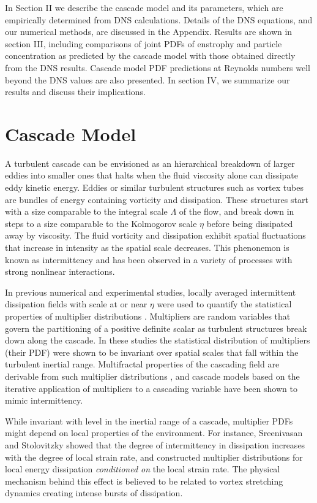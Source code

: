 \documentclass[aps,pra,twocolumn,groupedaddress,showkeys,showpacs,floatfix]{revtex4}
\begin{document}
In Section II we describe the cascade model and its parameters, which are
empirically determined from DNS calculations. Details of the DNS equations, and
our numerical methods, are discussed in the Appendix. Results are shown in section
III, including comparisons of joint PDFs of enstrophy and particle
concentration as predicted by the cascade model with those obtained directly
from the DNS results. Cascade model PDF predictions at Reynolds numbers well
beyond the DNS values are also presented. In section IV, we summarize our
results and discuss their implications.
 
\section{ Cascade Model }

 A turbulent cascade can be envisioned as an hierarchical breakdown  of larger
eddies into smaller ones that halts when the  fluid viscosity alone can
dissipate eddy kinetic energy. Eddies or similar turbulent structures such as
vortex tubes are
bundles of energy containing vorticity and dissipation. These
structures start with a size comparable to the integral scale $\Lambda$ of
the flow, and break down in steps to a size  comparable to the Kolmogorov scale
$\eta$ before being dissipated away by viscosity.  The fluid vorticity and
dissipation exhibit spatial fluctuations that increase in intensity as the
spatial scale decreases. This phenonemon is known as intermittency and has been
observed in a variety of processes with strong nonlinear interactions.

In previous numerical and experimental studies, locally averaged intermittent
dissipation fields with scale at or near $\eta$ were used to quantify the
statistical properties of multiplier distributions \cite{Sreenivasan:1}.
Multipliers are random variables that govern the partitioning of a  positive
definite scalar as turbulent structures break down along the cascade. In these
studies the statistical distribution of multipliers (their PDF) were shown to be
invariant over spatial scales that fall within the turbulent inertial range.
Multifractal properties of the cascading field are derivable from such 
multiplier distributions \cite{Novikov:1}, and cascade models based on the
iterative application of multipliers to a cascading variable have been shown to
mimic intermittency.

While invariant with level in the inertial range of a cascade, multiplier PDFs might depend on local
properties of the environment. For instance, Sreenivasan and Stolovitzky \cite{Sreenivasan:1} showed
that  the degree of intermittency in dissipation increases with the degree of
local strain rate, and constructed multiplier distributions for local energy
dissipation {\it conditioned on} the local strain rate. The physical mechanism
behind this effect is believed to be related to vortex stretching dynamics
creating intense bursts of dissipation. 
\end{document}
